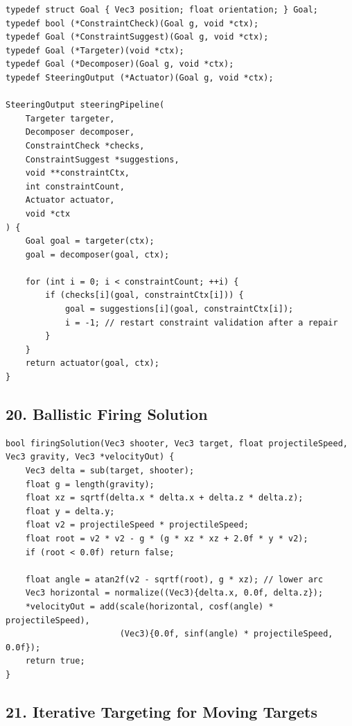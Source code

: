 \documentclass[10pt,letterpaper]{article}
\begin{document}
\begin{verbatim}
typedef struct Goal { Vec3 position; float orientation; } Goal;
typedef bool (*ConstraintCheck)(Goal g, void *ctx);
typedef Goal (*ConstraintSuggest)(Goal g, void *ctx);
typedef Goal (*Targeter)(void *ctx);
typedef Goal (*Decomposer)(Goal g, void *ctx);
typedef SteeringOutput (*Actuator)(Goal g, void *ctx);

SteeringOutput steeringPipeline(
    Targeter targeter,
    Decomposer decomposer,
    ConstraintCheck *checks,
    ConstraintSuggest *suggestions,
    void **constraintCtx,
    int constraintCount,
    Actuator actuator,
    void *ctx
) {
    Goal goal = targeter(ctx);
    goal = decomposer(goal, ctx);

    for (int i = 0; i < constraintCount; ++i) {
        if (checks[i](goal, constraintCtx[i])) {
            goal = suggestions[i](goal, constraintCtx[i]);
            i = -1; // restart constraint validation after a repair
        }
    }
    return actuator(goal, ctx);
}
\end{verbatim}

\subsection*{20. Ballistic Firing Solution}
{}

\begin{verbatim}
bool firingSolution(Vec3 shooter, Vec3 target, float projectileSpeed, Vec3 gravity, Vec3 *velocityOut) {
    Vec3 delta = sub(target, shooter);
    float g = length(gravity);
    float xz = sqrtf(delta.x * delta.x + delta.z * delta.z);
    float y = delta.y;
    float v2 = projectileSpeed * projectileSpeed;
    float root = v2 * v2 - g * (g * xz * xz + 2.0f * y * v2);
    if (root < 0.0f) return false;

    float angle = atan2f(v2 - sqrtf(root), g * xz); // lower arc
    Vec3 horizontal = normalize((Vec3){delta.x, 0.0f, delta.z});
    *velocityOut = add(scale(horizontal, cosf(angle) * projectileSpeed),
                       (Vec3){0.0f, sinf(angle) * projectileSpeed, 0.0f});
    return true;
}
\end{verbatim}

\subsection*{21. Iterative Targeting for Moving Targets}
{}
\end{document}
